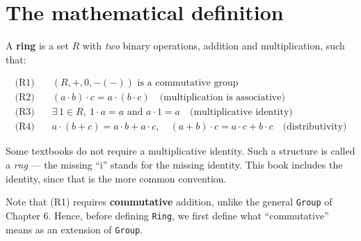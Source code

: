 \section{The mathematical definition}\label{sec:08-rings:01-definition:1}

A \textbf{ring} is a set \(R\) with \emph{two} binary operations, addition and multiplication, such that:

\[
\begin{aligned}
\text{(R1)}&\quad (R, +, 0, -(-)) \text{ is a commutative group} \\
\text{(R2)}&\quad (a \cdot b) \cdot c = a \cdot (b \cdot c) \quad \text{(multiplication is associative)} \\
\text{(R3)}&\quad \exists\, 1 \in R,\ 1 \cdot a = a \text{ and } a \cdot 1 = a \quad \text{(multiplicative identity)} \\
\text{(R4)}&\quad a \cdot (b + c) = a \cdot b + a \cdot c, \quad (a + b) \cdot c = a \cdot c + b \cdot c \quad \text{(distributivity)}
\end{aligned}
\]

Some textbooks do not require a multiplicative identity. Such a structure is called a \emph{rng} --- the missing ``i'' stands for the missing identity. This book includes the identity, since that is the more common convention.

Note that (R1) requires \textbf{commutative} addition, unlike the general \texttt{Group} of Chapter 6. Hence, before defining \texttt{Ring}, we first define what ``commutative'' means as an extension of \texttt{Group}.
